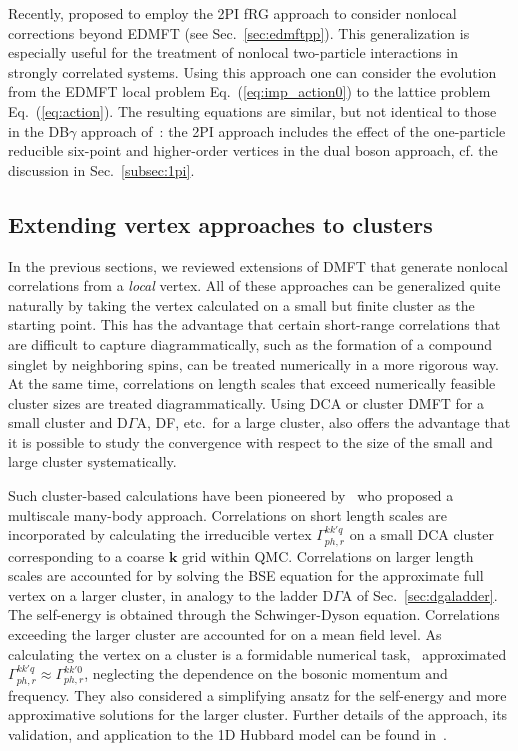 \documentclass[rmp,aps,reprint,amsmath,amssymb,superscriptaddress,showpacs,nofootinbib]{revtex4-1}
\begin{document}
Recently,  proposed to employ the 2PI fRG approach to consider nonlocal corrections beyond EDMFT (see Sec.~\ref{sec:edmftpp}). This generalization is especially useful for the treatment of nonlocal two-particle interactions in strongly correlated systems. Using this approach one can consider the evolution from the EDMFT local problem Eq.~(\ref{eq:imp_action0}) to the lattice problem Eq.~(\ref{eq:action}). The resulting equations are similar, but not identical to those in the DB$\gamma$ approach of~: the 2PI approach includes the effect of the one-particle reducible six-point and higher-order vertices in the dual boson approach, cf. the discussion in Sec.~\ref{subsec:1pi}.

\subsection{Extending vertex approaches to clusters}
\label{sec:clusterdf}
\label{sec:cluster}  

In the previous sections, we reviewed extensions of DMFT that generate nonlocal correlations from a {\em local} vertex. All of these approaches can be generalized quite naturally by taking the vertex calculated on a small but finite cluster as the starting point. This has the advantage that certain short-range correlations that are difficult to capture diagrammatically, such as the formation of a compound singlet by neighboring spins, can be treated numerically in a more rigorous way. At the same time, correlations on length scales that exceed numerically feasible cluster sizes are treated diagrammatically. Using DCA or cluster DMFT for a small cluster and D$\Gamma$A, DF, etc.\, for a large  cluster, also offers the advantage  that it is possible to study the convergence with respect to the size of the small and large cluster systematically.

Such cluster-based calculations have been pioneered by~ who proposed a multiscale many-body approach. Correlations on short length scales are incorporated by calculating the irreducible vertex $\Gamma_{ph,r}^{kk'q}$ on a small DCA cluster corresponding to a coarse ${\mathbf k}$ grid within QMC. Correlations on larger length scales are accounted for by solving the BSE equation for the approximate full vertex on a larger cluster, in analogy to the ladder D$\Gamma$A of Sec.~\ref{sec:dgaladder}. The self-energy is obtained through the Schwinger-Dyson equation. Correlations exceeding the larger cluster are accounted for on a mean field level. As calculating the vertex on a cluster is a formidable numerical task,~ approximated $\Gamma_{ph,r}^{kk'q}\approx \Gamma_{ph,r}^{kk'0}$, neglecting the dependence on the bosonic momentum and frequency. They also considered a simplifying ansatz for the self-energy and more approximative solutions for the larger cluster. Further details of the approach, its validation, and application to the 1D Hubbard model can be found in~.
\end{document}
